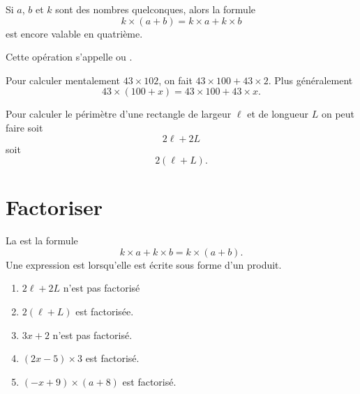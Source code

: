 \begin{Aretenir}
    Si \( a\), \( b\) et \( k\) sont des nombres quelconques, alors la formule
    \begin{equation}
        k\times (a+b)= k\times a+k\times b
    \end{equation}
    est encore valable en quatrième.

    Cette opération s'appelle  ou .
\end{Aretenir}

\begin{example}
    Pour calculer mentalement \( 43\times 102\), on fait \( 43\times 100+43\times 2\). Plus généralement
    \begin{equation}
        43\times (100+x)=43\times 100+43\times x.
    \end{equation}
\end{example}

\begin{example}
    Pour calculer le périmètre d'une rectangle de largeur \( \ell\) et de longueur \( L\) on peut faire soit
    \begin{equation}
        2\ell+2L
    \end{equation}
    soit
    \begin{equation}
        2(\ell+L).
    \end{equation}
\end{example}

\section{Factoriser}

\begin{Aretenir}
    La  est la formule
    \begin{equation}
        k\times a+k\times b=k\times (a+b).
    \end{equation}
    Une expression est  lorsqu'elle est écrite sous forme d'un produit.
\end{Aretenir}

\begin{example}
    \begin{enumerate}
        \item
            \( 2\ell+2L\) n'est pas factorisé
        \item
            \( 2(\ell+L)\) est factorisée.
        \item
            \( 3x+2\) n'est pas factorisé.
        \item
            \( (2x-5)\times 3\) est factorisé.
        \item
            \( (-x+9)\times (a+8)\) est factorisé.
    \end{enumerate}
\end{example}


